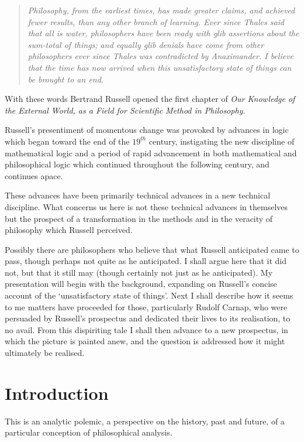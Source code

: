 
\begin{quote}
\emph{
Philosophy, from the earliest times, has made greater claims, and achieved fewer results, than any other branch of learning. Ever since Thales said that all is water, philosophers have been ready with glib assertions about the sum-total of things; and equally glib denials have come from other philosophers ever since Thales was contradicted by Anaximander. I believe that the time has now arrived when this unsatisfactory state of things can be brought to an end.}
\end{quote}
With these words Bertrand Russell opened the first chapter of \emph{Our Knowledge of the External World, as a Field for Scientific Method in Philosophy}\cite{russell1921}.

Russell's presentiment of momentous change was provoked by advances in logic which began toward the end of the $19^{th}$ century, instigating the new discipline of mathematical logic and a period of rapid advancement in both mathematical and philosophical logic which continued throughout the following century, and continues apace.

These advances have been primarily technical advances in a new technical discipline.
What concerns us here is not these technical advances in themselves but the prospect of a transformation in the methods and in the veracity of philosophy which Russell perceived.

Possibly there are philosophers who believe that what Russell anticipated came to pass, though perhaps not quite as he anticipated.
I shall argue here that it did not, but that it still may (though certainly not just as he anticipated).
My presentation will begin with the background, expanding on Russell's concise account of the `unsatisfactory state of things'.
Next I shall describe how it seems to me matters have proceeded for those, particularly Rudolf Carnap, who were persuaded by Russell's prospectus and dedicated their lives to its realisation, to no avail.
From this dispiriting tale I shall then advance to a new prospectus, in which the picture is painted anew, and the question is addressed how it might ultimately be realised.

\chapter{Introduction}

This is an analytic polemic, a perspective on the history, past and future, of a particular conception of philosophical analysis.

